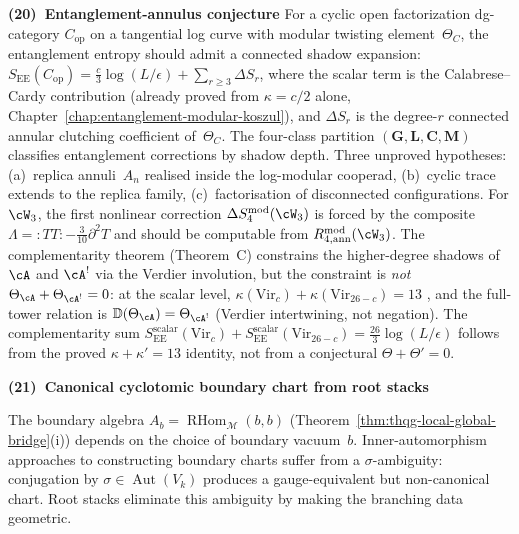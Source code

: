 \smallskip\noindent
\textbf{(20)~Entanglement-annulus conjecture}%
\label{item:concordance-entanglement-annulus}%
%
\ClaimStatusConjectured{}
For a cyclic open factorization dg-category
$C_{\mathrm{op}}$ on a tangential log curve with
modular twisting element~$\Theta_C$, the entanglement entropy
should admit a connected shadow expansion:
$S_{\mathrm{EE}}(C_{\mathrm{op}}) = \tfrac{c}{3}\log(L/\epsilon)
+ \sum_{r \geq 3} \Delta S_r$,
where the scalar term is the Calabrese--Cardy contribution
(already proved from $\kappa = c/2$ alone,
Chapter~\ref{chap:entanglement-modular-koszul}), and
$\Delta S_r$ is the degree-$r$ connected annular clutching
coefficient of~$\Theta_C$. The four-class
partition $({\mathbf G}, {\mathbf L}, {\mathbf C}, {\mathbf M})$
classifies entanglement corrections by shadow depth.
Three unproved hypotheses: (a)~replica annuli~$A_n$
realised inside the log-modular cooperad,
(b)~cyclic trace extends to the replica family,
(c)~factorisation of disconnected configurations.
For $\cW_3$, the first nonlinear correction
$\Delta S_4^{\mathrm{mod}}(\cW_3)$ is forced by the
composite $\Lambda = :TT: - \tfrac{3}{10}\partial^2 T$
and should be computable from
$R^{\mathrm{mod}}_{4,\mathrm{ann}}(\cW_3)$.
The complementarity theorem (Theorem~C) constrains the
higher-degree shadows of $\cA$ and $\cA^!$ via the
Verdier involution, but the constraint is \emph{not}
$\Theta_\cA + \Theta_{\cA^!} = 0$: at the scalar level,
$\kappa(\mathrm{Vir}_c) + \kappa(\mathrm{Vir}_{26-c}) = 13$
, and the full-tower relation is
$\mathbb{D}(\Theta_\cA) = \Theta_{\cA^!}$
(Verdier intertwining, not negation).
The complementarity sum
$S_{\mathrm{EE}}^{\mathrm{scalar}}(\mathrm{Vir}_c)
+ S_{\mathrm{EE}}^{\mathrm{scalar}}(\mathrm{Vir}_{26-c})
= \tfrac{26}{3}\log(L/\epsilon)$
follows from the proved $\kappa + \kappa' = 13$
identity, not from a conjectural
$\Theta + \Theta' = 0$.

\smallskip\noindent
\textbf{(21)~Canonical cyclotomic boundary chart from root stacks}%
\label{item:concordance-cyclotomic-chart}%
%
%
%

The boundary algebra
$A_b = \operatorname{RHom}_{\mathcal{M}}(b, b)$
(Theorem~\ref{thm:thqg-local-global-bridge}(i))
depends on the choice of boundary vacuum~$b$.
Inner-automorphism approaches to constructing
boundary charts suffer from a $\sigma$-ambiguity:
conjugation by $\sigma \in \operatorname{Aut}(V_k)$
produces a gauge-equivalent but non-canonical chart.
Root stacks eliminate this ambiguity by making the
branching data geometric.


